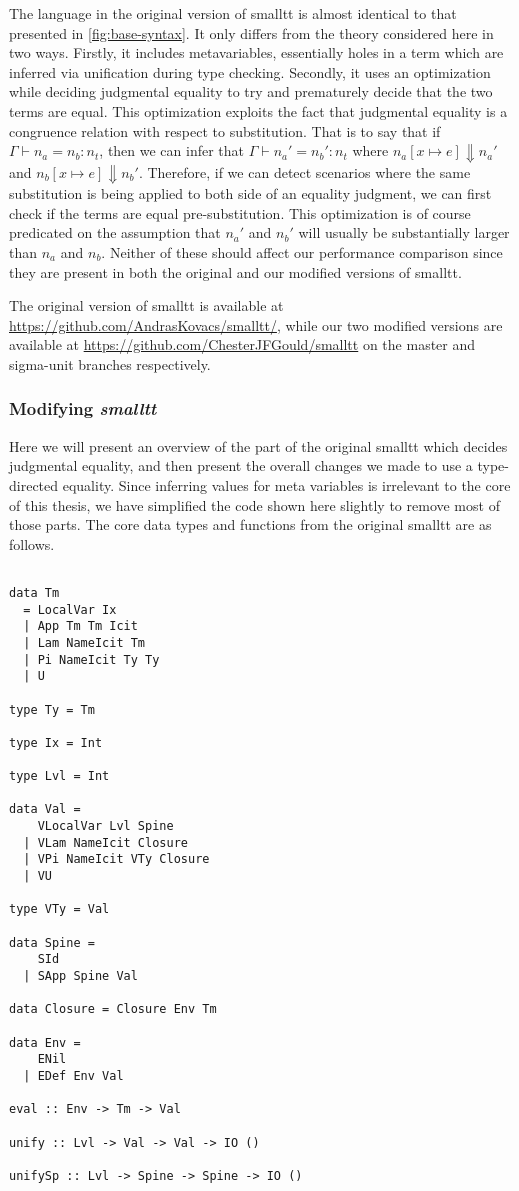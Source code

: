 \documentclass[sigplan,nonacm]{acmart}
\newcommand{\tyEqJ}[4]{#1 \vdash #2 = #3 : #4}
\newcommand{\steps}[2]{#1 \Downarrow #2}
\newcommand{\subst}[3]{#1 [#2 \mapsto #3]}
\begin{document}
The language in the original version of smalltt is almost identical to that presented in \autoref{fig:base-syntax}.
It only differs from the theory considered here in two ways.
Firstly, it includes metavariables, essentially holes in a term which are inferred via unification during type checking.
Secondly, it uses an optimization while deciding judgmental equality to try and prematurely decide that the two terms are equal.
This optimization exploits the fact that judgmental equality is a congruence relation with respect to substitution.
That is to say that if $\tyEqJ{\Gamma}{n_a}{n_b}{n_t}$, then we can infer that $\tyEqJ{\Gamma}{n_a'}{n_b'}{n_t}$ where $\steps{\subst{n_a}{x}{e}}{n_a'}$ and $\steps{\subst{n_b}{x}{e}}{n_b'}$.
Therefore, if we can detect scenarios where the same substitution is being applied to both side of an equality judgment, we can first check if the terms are equal pre-substitution.
This optimization is of course predicated on the assumption that $n_a'$ and $n_b'$ will usually be substantially larger than $n_a$ and $n_b$.
Neither of these should affect our performance comparison since they are present in both the original and our modified versions of smalltt.

The original version of smalltt is available at \url{https://github.com/AndrasKovacs/smalltt/}, while our two modified versions are available at \url{https://github.com/ChesterJFGould/smalltt} on the master and sigma-unit branches respectively.

\subsubsection{Modifying \textit{smalltt}}

Here we will present an overview of the part of the original smalltt which decides judgmental equality, and then present the overall changes we made to use a type-directed equality.
Since inferring values for meta variables is irrelevant to the core of this thesis, we have simplified the code shown here slightly to remove most of those parts.
The core data types and functions from the original smalltt are as follows.

\newpage

\begin{lstlisting}

data Tm
  = LocalVar Ix
  | App Tm Tm Icit
  | Lam NameIcit Tm
  | Pi NameIcit Ty Ty
  | U

type Ty = Tm

type Ix = Int

type Lvl = Int

data Val =
    VLocalVar Lvl Spine
  | VLam NameIcit Closure
  | VPi NameIcit VTy Closure
  | VU

type VTy = Val

data Spine =
    SId
  | SApp Spine Val

data Closure = Closure Env Tm

data Env =
    ENil
  | EDef Env Val

eval :: Env -> Tm -> Val

unify :: Lvl -> Val -> Val -> IO ()

unifySp :: Lvl -> Spine -> Spine -> IO ()
\end{lstlisting}
\end{document}
